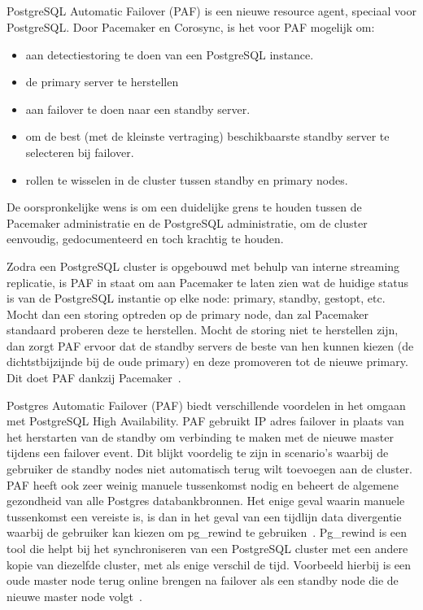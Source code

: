 \subsection{}
\label{subsec:PostgreSQL Automatic Failover (PAF)}

PostgreSQL Automatic Failover (PAF) is een nieuwe resource agent, speciaal voor PostgreSQL. Door Pacemaker en Corosync, is het voor PAF mogelijk om:

\begin{itemize}
    \item aan detectiestoring te doen van een PostgreSQL instance.
    \item de primary server te herstellen
    \item aan failover te doen naar een standby server.
    \item om de best (met de kleinste vertraging) beschikbaarste standby server te selecteren bij failover.
    \item rollen te wisselen in de cluster tussen standby en primary nodes.
\end{itemize}

De oorspronkelijke wens is om een duidelijke grens te houden tussen de Pacemaker administratie en de PostgreSQL administratie, om de cluster eenvoudig, gedocumenteerd en toch krachtig te houden.

Zodra een PostgreSQL cluster is opgebouwd met behulp van interne streaming replicatie, is PAF in staat om aan Pacemaker te laten zien wat de huidige status is van de PostgreSQL instantie op elke node: primary, standby, gestopt, etc. Mocht dan een storing optreden op de primary node, dan zal Pacemaker standaard proberen deze te herstellen. Mocht de storing niet te herstellen zijn, dan zorgt PAF ervoor dat de standby servers de beste van hen kunnen kiezen (de dichtstbijzijnde bij de oude primary) en deze promoveren tot de nieuwe primary. Dit doet PAF dankzij Pacemaker~\autocite{Rimbault2020}. %

Postgres Automatic Failover (PAF) biedt verschillende voordelen in het omgaan met PostgreSQL High Availability. PAF gebruikt IP adres failover in plaats van het herstarten van de standby om verbinding te maken met de nieuwe master tijdens een failover event. Dit blijkt voordelig te zijn in scenario's waarbij de gebruiker de standby nodes niet automatisch terug wilt toevoegen aan de cluster. PAF heeft ook zeer weinig manuele tussenkomst nodig en beheert de algemene gezondheid van alle Postgres databankbronnen. Het enige geval waarin manuele tussenkomst een vereiste is, is dan in het geval van een tijdlijn data divergentie waarbij de gebruiker kan kiezen om pg\_rewind te gebruiken~\autocite{ScaleGrid2018a}. Pg\_rewind is een tool die helpt bij het synchroniseren van een PostgreSQL cluster met een andere kopie van diezelfde cluster, met als enige verschil de tijd. Voorbeeld hierbij is een oude master node terug online brengen na failover als een standby node die de nieuwe master node volgt~\autocite{PostgreSQL2021b}. %

